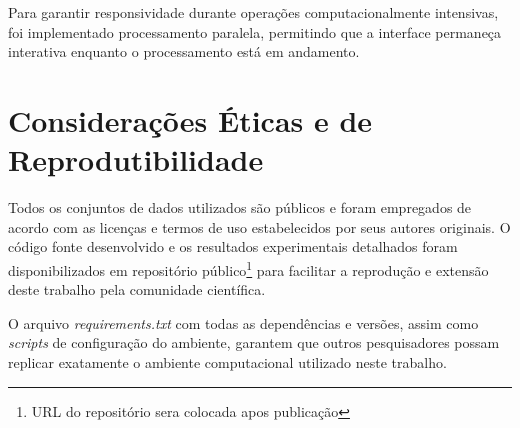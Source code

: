 Para garantir responsividade durante operações computacionalmente intensivas, foi implementado processamento paralela, permitindo que a interface permaneça interativa enquanto o processamento está em andamento.

\section{Considerações Éticas e de Reprodutibilidade}

Todos os conjuntos de dados utilizados são públicos e foram empregados de acordo com as licenças e termos de uso estabelecidos por seus autores originais. O código fonte desenvolvido e os resultados experimentais detalhados foram disponibilizados em repositório público\footnote{URL do repositório sera colocada apos publicação} para facilitar a reprodução e extensão deste trabalho pela comunidade científica.

O arquivo \textit{requirements.txt} com todas as dependências e versões, assim como \textit{scripts} de configuração do ambiente, garantem que outros pesquisadores possam replicar exatamente o ambiente computacional utilizado neste trabalho.